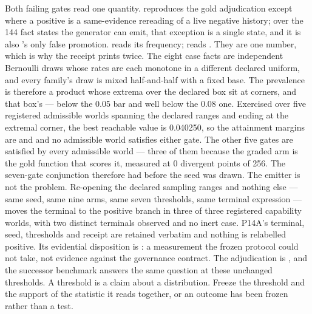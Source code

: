 {}Both failing gates read one quantity.  reproduces the gold adjudication except where a positive is a same-evidence rereading of a live negative history; over the 144 fact states the generator can emit, that exception is a single state, and it is also 's only false promotion.  reads its frequency;  reads . They are one number, which is why the receipt prints  twice.\markdownRendererInterblockSeparator
{}The eight case facts are independent Bernoulli draws whose rates are each monotone in a different declared uniform, and every family's draw is mixed half-and-half with a fixed base. The prevalence is therefore a product whose extrema over the declared box sit at corners, and that box's  — below the 0.05 bar and well below the 0.08 one. Exercised over five registered admissible worlds spanning the declared ranges and ending at the extremal corner, the best reachable value is 0.040250, so the attainment margins are  and  and no admissible world satisfies either gate. The other five gates are satisfied by every admissible world — three of them because the graded  arm is the gold function that scores it, measured at 0 divergent points of 256. The seven-gate conjunction therefore had  before the seed was drawn.\markdownRendererInterblockSeparator
{}The emitter is not the problem. Re-opening the declared sampling ranges and nothing else — same seed, same nine arms, same seven thresholds, same terminal expression — moves the terminal to the positive branch in three of three registered capability worlds, with two distinct terminals observed and no inert case.\markdownRendererInterblockSeparator
{}P14A's terminal, seed, thresholds and receipt are retained verbatim and nothing is relabelled positive. Its evidential disposition is : a measurement the frozen protocol could not take, not evidence against the governance contract. The adjudication is , and the successor benchmark answers the same question at these unchanged thresholds.\markdownRendererInterblockSeparator
{}A threshold is a claim about a distribution. Freeze the threshold and the support of the statistic it reads together, or an outcome has been frozen rather than a test.
\markdownRendererSectionEnd 
\markdownRendererSectionEnd \markdownRendererDocumentEnd